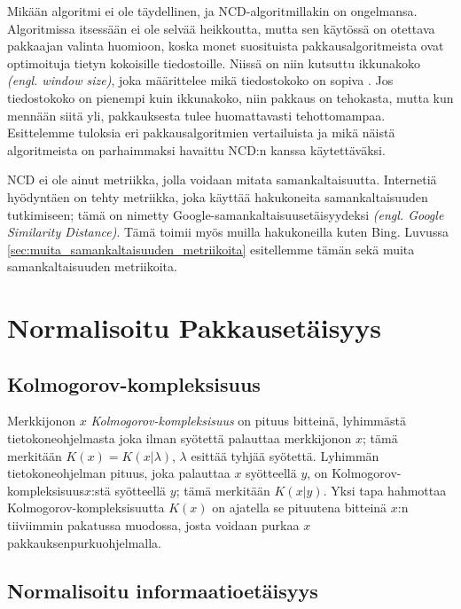 \documentclass[12pt,finnish,draft]{tktltiki2}
\theoremstyle{definition}
\theoremstyle{remark}
\newcommand{\engl}[1]{\emph{(engl. #1)}}
\newcommand{\kolmogorov}{Kolmogorov-kompleksisuus}
\begin{document}
  Mikään algoritmi ei ole täydellinen, ja NCD-algoritmillakin on ongelmansa.
  Algoritmissa itsessään ei ole selvää heikkoutta, mutta sen käytössä on otettava pakkaajan valinta huomioon, koska monet suosituista pakkausalgoritmeista ovat optimoituja tietyn kokoisille tiedostoille.
  Niissä on niin kutsuttu ikkunakoko \engl{window size}, joka määrittelee mikä tiedostokoko on sopiva \cite{cebrian2005common}.
  Jos tiedostokoko on pienempi kuin ikkunakoko, niin pakkaus on tehokasta, mutta kun mennään siitä yli, pakkauksesta tulee huomattavasti tehottomampaa.
  Esittelemme tuloksia eri pakkausalgoritmien vertailuista ja mikä näistä algoritmeista on parhaimmaksi havaittu NCD:n kanssa käytettäväksi.


\label{par:intro-5}
  NCD ei ole ainut metriikka, jolla voidaan mitata samankaltaisuutta.
  Internetiä hyödyntäen on tehty metriikka, joka käyttää hakukoneita samankaltaisuuden tutkimiseen; tämä on nimetty Google-samankaltaisuusetäisyydeksi \engl{Google Similarity Distance}.
  Tämä toimii myös muilla hakukoneilla kuten Bing. Luvussa \ref{sec:muita_samankaltaisuuden_metriikoita} esitellemme tämän sekä muita samankaltaisuuden metriikoita.


\section{Normalisoitu Pakkausetäisyys} %
\label{sec:normalisoitu_pakkausetaisyys}
  \subsection{\kolmogorov} %
\label{sub:kolmogorov_kompleksisuus}

  Merkkijonon $x$ \emph{\kolmogorov} on pituus bitteinä, lyhimmästä tietokoneohjelmasta joka ilman syötettä palauttaa merkkijonon $x$; tämä merkitään $K(x)=K(x|\lambda)$, $\lambda$ esittää tyhjää syötettä.
  Lyhimmän tietokoneohjelman pituus, joka palauttaa $x$ syötteellä $y$, on \kolmogorov $x$:stä syötteellä $y$; tämä merkitään $K(x|y)$.
  Yksi tapa hahmottaa Kolmogorov-kompleksisuutta $K(x)$ on ajatella se pituutena bitteinä $x$:n tiiviimmin pakatussa muodossa, josta voidaan purkaa $x$ pakkauksenpurkuohjelmalla.

\subsection{Normalisoitu informaatioetäisyys} %
\label{sub:normalisoitu_informaatioetaisyys}
\end{document}
